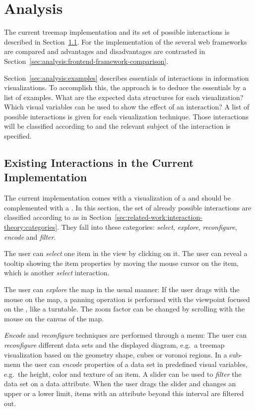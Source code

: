 \chapter{Analysis}\label{sec:analysis}
The current treemap implementation and its set of possible interactions is described in Section~\ref{sec:analysis:existing-interactions}.
For the implementation of the \gv{} several web frameworks are compared and advantages and disadvantages are contrasted in Section~\ref{sec:analysis:frontend-framework-comparison}.

Section~\ref{sec:analysis:examples} describes essentials of interactions in information visualizations.
To accomplish this, the approach is to deduce the essentials by a list of examples.
What are the expected data structures for each visualization?
Which visual variables can be used to show the effect of an interaction?
A list of possible interactions is given for each visualization technique.
Those interactions will be classified according to \textcite{Yi2007} and the relevant subject of the interaction is specified.



\section{Existing Interactions in the Current Implementation}\label{sec:analysis:existing-interactions}
The current implementation comes with a visualization of a \tmap{} and should be complemented with a \gv{}.
In this section, the set of already possible interactions are classified according to \textcite{Yi2007} as in Section~\ref{sec:related-work:interaction-theory:categories}.
They fall into these categories: \emph{select}, \emph{explore}, \emph{reconfigure}, \emph{encode} and \emph{filter}.

The user can \emph{select} one item in the view by clicking on it.
The user can reveal a tooltip showing the item properties by moving the mouse cursor on the item, which is another \emph{select} interaction.

The user can \emph{explore} the map in the usual manner:
If the user drags with the mouse on the map, a panning operation is performed with the viewpoint focused on the \tmap{}, like a turntable.
The zoom factor can be changed by scrolling with the mouse on the canvas of the map.

\emph{Encode} and \emph{reconfigure} techniques are performed through a menu:
The user can \emph{reconfigure} different data sets and the displayed diagram, e.g.\ a treemap visualization based on the geometry shape, cubes or voronoi regions.
In a sub-menu the user can \emph{encode} properties of a data set in predefined visual variables, e.g.\ the height, color and texture of an item.
A slider can be used to \emph{filter} the data set on a data attribute.
When the user drags the slider and changes an upper or a lower limit, items with an attribute beyond this interval are filtered out.



